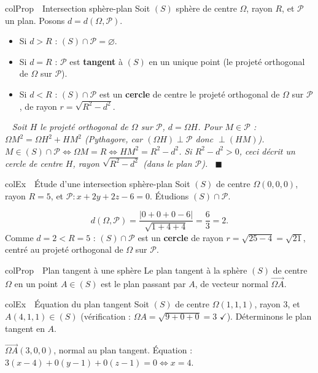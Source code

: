 \documentclass[11pt,a4paper]{article}
\newenvironment{propriete}[1][Propriété]
  {\begin{fiche}{colProp}{\ding{72}~~#1}}{\end{fiche}}
\newenvironment{exemple}[1][Exemple]
  {\begin{fiche}{colEx}{\ding{217}~~#1}}{\end{fiche}}
\newenvironment{demo}
  {\par\smallskip\noindent{\sffamily\bfseries\color{qtealdark}Démonstration.}\ \itshape}
  {\ \normalfont\hfill$\blacksquare$\par\medskip}
\begin{document}
\begin{propriete}[Intersection sphère-plan]
Soit $(S)$ sphère de centre $\Omega$, rayon $R$, et $\mathcal{P}$ un plan. Posons $d=d(\Omega,\mathcal{P})$.
\begin{itemize}[leftmargin=6mm, itemsep=0.5mm]
  \item Si $d>R$ : $(S)\cap\mathcal{P}=\varnothing$.
  \item Si $d=R$ : $\mathcal{P}$ est \textbf{tangent} à $(S)$ en un unique point (le projeté orthogonal de $\Omega$ sur $\mathcal{P}$).
  \item Si $d<R$ : $(S)\cap\mathcal{P}$ est un \textbf{cercle} de centre le projeté orthogonal de $\Omega$ sur $\mathcal{P}$, de rayon $r=\sqrt{R^2-d^2}$.
\end{itemize}
\end{propriete}

\begin{demo}
Soit $H$ le projeté orthogonal de $\Omega$ sur $\mathcal{P}$, $d=\Omega H$. Pour $M\in\mathcal{P}$ : $\Omega M^2=\Omega H^2+HM^2$ (Pythagore, car $(\Omega H)\perp\mathcal{P}$ donc $\perp(HM)$). $M\in(S)\cap\mathcal{P} \iff \Omega M=R \iff HM^2=R^2-d^2$. Si $R^2-d^2>0$, ceci décrit un cercle de centre $H$, rayon $\sqrt{R^2-d^2}$ (dans le plan $\mathcal{P}$).
\end{demo}

\begin{exemple}[Étude d'une intersection sphère-plan]
Soit $(S)$ de centre $\Omega(0,0,0)$, rayon $R=5$, et $\mathcal{P}:x+2y+2z-6=0$. Étudions $(S)\cap\mathcal{P}$.

\smallskip
\[
  d(\Omega,\mathcal{P}) = \frac{|0+0+0-6|}{\sqrt{1+4+4}} = \frac{6}{3} = 2.
\]
Comme $d=2<R=5$ : $(S)\cap\mathcal{P}$ est un \textbf{cercle} de rayon $r=\sqrt{25-4}=\sqrt{21}$, centré au projeté orthogonal de $\Omega$ sur $\mathcal{P}$.
\end{exemple}

\begin{propriete}[Plan tangent à une sphère]
Le plan tangent à la sphère $(S)$ de centre $\Omega$ en un point $A\in(S)$ est le plan passant par $A$, de vecteur normal $\overrightarrow{\Omega A}$.
\end{propriete}

\begin{exemple}[Équation du plan tangent]
Soit $(S)$ de centre $\Omega(1,1,1)$, rayon $3$, et $A(4,1,1)\in(S)$ (vérification : $\Omega A=\sqrt{9+0+0}=3$ $\checkmark$). Déterminons le plan tangent en $A$.

\smallskip
$\overrightarrow{\Omega A}(3,0,0)$, normal au plan tangent. Équation : $3(x-4)+0(y-1)+0(z-1)=0\iff x=4$.
\end{exemple}
\end{document}

